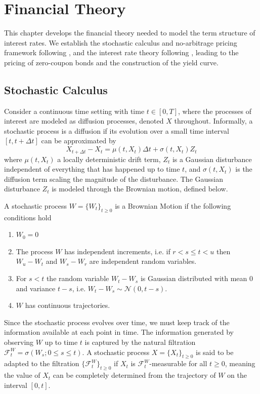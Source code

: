 \chapter{Financial Theory}
\label{chap:finance_theory}

This chapter develops the financial theory needed to model the term structure of interest rates. We establish the stochastic calculus and no-arbitrage pricing framework following \citet{Bjork2020}, and the interest rate theory following \citet{Filipovic2009}, leading to the pricing of zero-coupon bonds and the construction of the yield curve.


\section{Stochastic Calculus}

Consider a continuous time setting with time $t\in[0,T]$, where the processes of interest are modeled as diffusion processes, denoted $X$ throughout. Informally, a stochastic process is a diffusion if its evolution over a small time interval $[t,t+\Delta t]$ can be approximated by 
\begin{equation}
    X_{t+\Delta t}-X_t=\mu(t,X_t)\Delta t +\sigma (t,X_t)Z_t
    \label{eq:diffprocess}
\end{equation}
where $\mu(t,X_t)$ a locally deterministic drift term, $Z_t$ is a Gaussian disturbance independent of everything that has happened up to time $t$, and $\sigma(t,X_t)$ is the diffusion term scaling the magnitude of the disturbance. The Gaussian disturbance $Z_t$ is modeled through the Brownian motion, defined below.
\begin{definition}
A stochastic process $W=\{W_t\}_{t\geq0}$ is a Brownian Motion if the following conditions hold
\begin{enumerate}
    \item $W_0=0$
    \item The process $W$ has independent increments, i.e. if $r<s\leq t <u$ then $W_u-W_t$ and $W_s-W_r$ are independent random variables.
    \item For $s<t$ the random variable $W_t-W_s$ is Gaussian distributed with  mean $0$ and variance $t-s$, i.e. $W_t-W_s\sim\mathcal{N}(0,t-s)$.
    \item $W$ has continuous trajectories.
\end{enumerate}
\label{def:BM}
\end{definition}


Since the stochastic process evolves over time, we must keep track of the information available at each point in time. The information generated by observing $W$ up to time $t$ is captured by the natural filtration $\mathcal{F}_t^W=\sigma(W_s;0\leq s\leq t)$. A stochastic process $X=\{X_t\}_{t\geq0}$ is said to be adapted to the filtration $\{\mathcal{F}_t^W\}_{t\geq 0}$ if $X_t$ is $\mathcal{F}_t^W$-measurable for all $t\geq 0$, meaning the value of $X_t$ can be completely determined from the trajectory of $W$ on the interval $[0,t]$.

